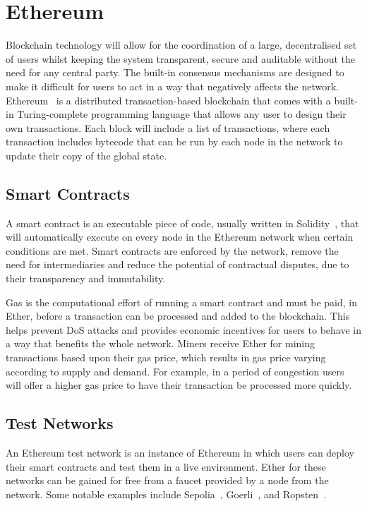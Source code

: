 
\section{Ethereum}

Blockchain technology will allow for the coordination of a large, decentralised set of users whilst keeping the system transparent, secure and auditable without the need for any central party. The built-in consensus mechanisms are designed to make it difficult for users to act in a way that negatively affects the network.
\x
Ethereum~\cite{vujicic_blockchain_2018,dannen_introducing_2017} is a distributed transaction-based blockchain that comes with a built-in Turing-complete programming language that allows any user to design their own transactions. Each block will include a list of transactions, where each transaction includes bytecode that can be run by each node in the network to update their copy of the global state.

\subsection*{Smart Contracts}

A smart contract is an executable piece of code, usually written in Solidity~\cite{noauthor_solidity_nodate}, that will automatically execute on every node in the Ethereum network when certain conditions are met. Smart contracts are enforced by the network, remove the need for intermediaries and reduce the potential of contractual disputes, due to their transparency and immutability.

\vspace{2mm}
\noindent
Gas is the computational effort of running a smart contract and must be paid, in Ether, before a transaction can be processed and added to the blockchain. This helps prevent DoS attacks and provides economic incentives for users to behave in a way that benefits the whole network.
\x
Miners receive Ether for mining transactions based upon their gas price, which results in gas price varying according to supply and demand. For example, in a period of congestion users will offer a higher gas price to have their transaction be processed more quickly.

\subsection*{Test Networks}

An Ethereum test network is an instance of Ethereum in which users can deploy their smart contracts and test them in a live environment. Ether for these networks can be gained for free from a faucet provided by a node from the network. Some notable examples include Sepolia~\cite{noauthor_sepolia_nodate}, Goerli~\cite{noauthor_goerli_nodate}, and Ropsten~\cite{noauthor_ropsten_2023}.